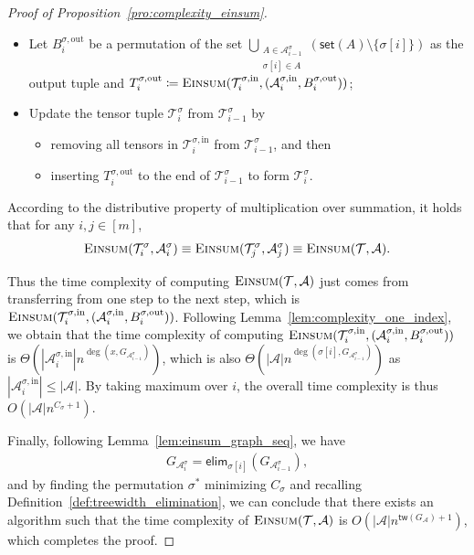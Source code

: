 \documentclass[sn-mathphys, natbib=false]{sn-jnl}
\theoremstyle{plain}
\theoremstyle{definition}
\newcommand{\takesetp}[1]{\mathsf{set}(#1)}
\newcommand{\tensorcontraction}{\textsc{Einsum}}
\newcommand{\degp}[2]{\deg(#1,#2)}
\newcommand{\treewidthp}[1]{\mathsf{tw}(#1)}
\newcommand{\graphform}[1]{G_{#1}}
\newcommand{\less}{O}
\newcommand{\appequal}{\Theta}
\newcommand{\eliminatevg}[2]{\mathsf{elim}_{#1}(#2)}
\def\calA{\mathcal{A}}
\def\calT{\mathcal{T}}
\begin{document}
\begin{bibunit}[agsm]
\begin{proof}[Proof of Proposition~\ref{pro:complexity_einsum}]
\begin{itemize}
    \item Let $B^{\sigma, \mathrm{out}}_i$ be a permutation of the set $\bigcup_{\substack{A \in \calA^{\sigma}_{i-1} \\ \sigma[i] \in A}} (\takesetp{A} \setminus \{\sigma[i]\})$ as the output tuple and $T^{\sigma, \mathrm{out}}_i \coloneqq \tensorcontraction(\calT^{\sigma, \mathrm{in}}_i, (\calA^{\sigma, \mathrm{in}}_i, B^{\sigma, \mathrm{out}}_i))$;
    
    \item Update the tensor tuple $\calT^{\sigma}_i$ from $\calT^{\sigma}_{i-1}$ by
    \begin{itemize}
        \item removing all tensors in $\calT^{\sigma, \mathrm{in}}_i$ from $\calT^{\sigma}_{i-1}$, and then
        \item inserting $T^{\sigma, \mathrm{out}}_i$ to the end of $\calT^{\sigma}_{i-1}$ to form $\calT^{\sigma}_{i}$.
    \end{itemize}
\end{itemize}

According to the distributive property of multiplication over summation, it holds that for any $i,j \in [m]$, 
\begin{align*}
\tensorcontraction(\calT^\sigma_i, \calA^\sigma_i) \equiv  \tensorcontraction(\calT^\sigma_j, \calA^\sigma_j) \equiv \tensorcontraction(\calT, \calA).
\end{align*}

Thus the time complexity of computing $\tensorcontraction(\calT, \calA)$ just comes from transferring from one step to the next step, which is $\tensorcontraction(\calT^{\sigma, \mathrm{in}}_i, (\calA^{\sigma, \mathrm{in}}_i, B^{\sigma, \mathrm{out}}_i))$. Following Lemma~\ref{lem:complexity_one_index}, we obtain that the time complexity of computing $\tensorcontraction(\calT^{\sigma, \mathrm{in}}_i, (\calA^{\sigma, \mathrm{in}}_i, B^{\sigma, \mathrm{out}}_i))$ is $\appequal(|\calA^{\sigma, \mathrm{in}}_i| n^{\degp{x}{\graphform{\calA^{\sigma}_{i-1}}}})$, which is also $\appequal(|\calA|n^{\degp{\sigma[i]}{\graphform{\calA^{\sigma}_{i-1}}}})$ as $|\calA^{\sigma, \mathrm{in}}_i| \leq |\calA|$. By taking maximum over $i$, the overall time complexity is thus $\less(|\calA|n^{C_\sigma + 1})$.

Finally, following Lemma~\ref{lem:einsum_graph_seq}, we have
\begin{align*}
\graphform{\calA^{\sigma}_i} = \eliminatevg{\sigma[i]}{\graphform{\calA^{\sigma}_{i-1}}},
\end{align*}
and by finding the permutation $\sigma^{\ast}$ minimizing $ C_{\sigma}$ and recalling Definition~\ref{def:treewidth_elimination}, we can conclude that there exists an algorithm such that the time complexity of $\tensorcontraction(\calT, \calA)$ is $\less(|\calA|n^{\treewidthp{G_\calA}+1})$, which completes the proof. 
\end{proof}


\end{bibunit}
\end{document}
